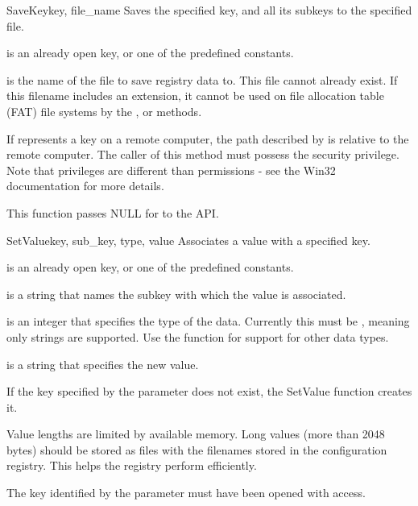 \begin{funcdesc}{SaveKey}{key, file_name}
  Saves the specified key, and all its subkeys to the specified file.

  is an already open key, or one of the predefined 
  constants.

  is the name of the file to save registry data to.
  This file cannot already exist. If this filename includes an extension,
  it cannot be used on file allocation table (FAT) file systems by the
  ,  or 
   methods.

 If  represents a key on a remote computer, the path 
 described by  is relative to the remote computer.
 The caller of this method must possess the  
 security privilege.  Note that privileges are different than permissions 
 - see the Win32 documentation for more details.
 
 This function passes NULL for  to the API.
\end{funcdesc}


\begin{funcdesc}{SetValue}{key, sub_key, type, value}
 Associates a value with a specified key.
 
  is an already open key, or one of the predefined 
  constants.

  is a string that names the subkey with which the value 
 is associated.
 
  is an integer that specifies the type of the data.  Currently this
 must be , meaning only strings are supported.
 Use the  function for support for other data types.
 
  is a string that specifies the new value.

 If the key specified by the  parameter does not exist, 
 the SetValue function creates it.

 Value lengths are limited by available memory. Long values (more than
 2048 bytes) should be stored as files with the filenames stored in 
 the configuration registry.  This helps the registry perform efficiently.

 The key identified by the  parameter must have been 
 opened with  access.
\end{funcdesc}



